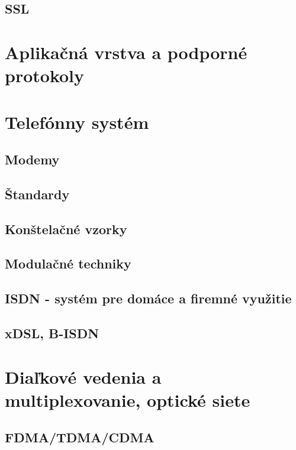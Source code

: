 \documentclass[10pt,a4paper]{article}
\begin{document}
\subsection{SSL}                             
\section{Aplikačná vrstva a podporné protokoly}            
\section{Telefónny systém}    
\subsection{Modemy}      
\subsection{Štandardy}    
\subsection{Konštelačné vzorky}  
\subsection{Modulačné techniky}   
\subsection{ISDN - systém pre domáce a firemné využitie}  
\subsection{xDSL, B-ISDN}       
\section{Diaľkové vedenia a multiplexovanie, optické siete}
\subsection{FDMA/TDMA/CDMA}                           
\end{document}
